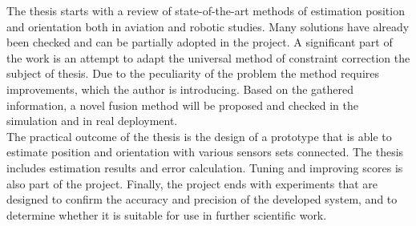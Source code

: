 The thesis starts with a review of state-of-the-art methods of estimation position and orientation both in aviation and robotic studies. Many solutions have already been checked and can be partially adopted in the project. A significant part of the work is an attempt to adapt the universal method of constraint correction the subject of thesis. Due to the peculiarity of the problem the method requires improvements, which the author is introducing. Based on the gathered information, a novel fusion method will be proposed and checked in the simulation and in real deployment.\\

The practical outcome of the thesis is the design of a prototype that is able to estimate position and orientation with various sensors sets connected. The thesis includes estimation results and error calculation. Tuning and improving scores is also part of the project. Finally, the project ends with experiments that are designed to confirm the accuracy and precision of the developed system, and to determine whether it is suitable for use in further scientific work. 